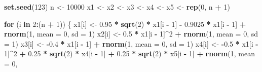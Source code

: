 \documentclass[]{book}
\newenvironment{Shaded}{\begin{snugshade}}{\end{snugshade}}
\newcommand{\KeywordTok}[1]{\textcolor[rgb]{0.13,0.29,0.53}{\textbf{#1}}}
\newcommand{\DataTypeTok}[1]{\textcolor[rgb]{0.13,0.29,0.53}{#1}}
\newcommand{\DecValTok}[1]{\textcolor[rgb]{0.00,0.00,0.81}{#1}}
\newcommand{\FloatTok}[1]{\textcolor[rgb]{0.00,0.00,0.81}{#1}}
\newcommand{\StringTok}[1]{\textcolor[rgb]{0.31,0.60,0.02}{#1}}
\newcommand{\ControlFlowTok}[1]{\textcolor[rgb]{0.13,0.29,0.53}{\textbf{#1}}}
\newcommand{\OperatorTok}[1]{\textcolor[rgb]{0.81,0.36,0.00}{\textbf{#1}}}
\newcommand{\NormalTok}[1]{#1}
\theoremstyle{definition}
\theoremstyle{definition}
\theoremstyle{definition}
\theoremstyle{remark}
\begin{document}
\begin{Shaded}
\begin{Highlighting}[]
\KeywordTok{set.seed}\NormalTok{(}\DecValTok{123}\NormalTok{)}
\NormalTok{n <-}\StringTok{ }\DecValTok{10000}
\NormalTok{x1 <-}\StringTok{ }\NormalTok{x2 <-}\StringTok{ }\NormalTok{x3 <-}\StringTok{ }\NormalTok{x4 <-}\StringTok{ }\NormalTok{x5 <-}\StringTok{ }\KeywordTok{rep}\NormalTok{(}\DecValTok{0}\NormalTok{, n }\OperatorTok{+}\StringTok{ }\DecValTok{1}\NormalTok{)}

\ControlFlowTok{for}\NormalTok{ (i }\ControlFlowTok{in} \DecValTok{2}\OperatorTok{:}\NormalTok{(n }\OperatorTok{+}\StringTok{ }\DecValTok{1}\NormalTok{)) \{}
\NormalTok{  x1[i] <-}\StringTok{ }\FloatTok{0.95} \OperatorTok{*}\StringTok{ }\KeywordTok{sqrt}\NormalTok{(}\DecValTok{2}\NormalTok{) }\OperatorTok{*}\StringTok{ }\NormalTok{x1[i }\OperatorTok{-}\StringTok{ }\DecValTok{1}\NormalTok{] }\OperatorTok{-}\StringTok{ }\FloatTok{0.9025} \OperatorTok{*}\StringTok{ }\NormalTok{x1[i }\OperatorTok{-}\StringTok{ }
\StringTok{    }\DecValTok{1}\NormalTok{] }\OperatorTok{+}\StringTok{ }\KeywordTok{rnorm}\NormalTok{(}\DecValTok{1}\NormalTok{, }\DataTypeTok{mean =} \DecValTok{0}\NormalTok{, }\DataTypeTok{sd =} \DecValTok{1}\NormalTok{)}
\NormalTok{  x2[i] <-}\StringTok{ }\FloatTok{0.5} \OperatorTok{*}\StringTok{ }\NormalTok{x1[i }\OperatorTok{-}\StringTok{ }\DecValTok{1}\NormalTok{]}\OperatorTok{^}\DecValTok{2} \OperatorTok{+}\StringTok{ }\KeywordTok{rnorm}\NormalTok{(}\DecValTok{1}\NormalTok{, }\DataTypeTok{mean =} \DecValTok{0}\NormalTok{, }\DataTypeTok{sd =} \DecValTok{1}\NormalTok{)}
\NormalTok{  x3[i] <-}\StringTok{ }\OperatorTok{-}\FloatTok{0.4} \OperatorTok{*}\StringTok{ }\NormalTok{x1[i }\OperatorTok{-}\StringTok{ }\DecValTok{1}\NormalTok{] }\OperatorTok{+}\StringTok{ }\KeywordTok{rnorm}\NormalTok{(}\DecValTok{1}\NormalTok{, }\DataTypeTok{mean =} \DecValTok{0}\NormalTok{, }\DataTypeTok{sd =} \DecValTok{1}\NormalTok{)}
\NormalTok{  x4[i] <-}\StringTok{ }\OperatorTok{-}\FloatTok{0.5} \OperatorTok{*}\StringTok{ }\NormalTok{x1[i }\OperatorTok{-}\StringTok{ }\DecValTok{1}\NormalTok{]}\OperatorTok{^}\DecValTok{2} \OperatorTok{+}\StringTok{ }\FloatTok{0.25} \OperatorTok{*}\StringTok{ }\KeywordTok{sqrt}\NormalTok{(}\DecValTok{2}\NormalTok{) }\OperatorTok{*}\StringTok{ }\NormalTok{x4[i }\OperatorTok{-}\StringTok{ }
\StringTok{    }\DecValTok{1}\NormalTok{] }\OperatorTok{+}\StringTok{ }\FloatTok{0.25} \OperatorTok{*}\StringTok{ }\KeywordTok{sqrt}\NormalTok{(}\DecValTok{2}\NormalTok{) }\OperatorTok{*}\StringTok{ }\NormalTok{x5[i }\OperatorTok{-}\StringTok{ }\DecValTok{1}\NormalTok{] }\OperatorTok{+}\StringTok{ }\KeywordTok{rnorm}\NormalTok{(}\DecValTok{1}\NormalTok{, }\DataTypeTok{mean =} \DecValTok{0}\NormalTok{, }

\end{Highlighting}
\end{Shaded}
\end{document}
